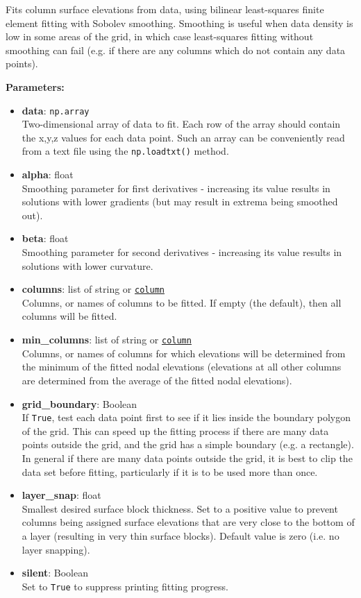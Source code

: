 Fits column surface elevations from data, using bilinear least-squares finite element fitting with Sobolev smoothing.  Smoothing is useful when data density is low in some areas of the grid, in which case least-squares fitting without smoothing can fail (e.g. if there are any columns which do not contain any data points).

\textbf{Parameters:}
\begin{itemize}
\item \textbf{data}: \texttt{np.array}\\
  Two-dimensional array of data to fit.  Each row of the array should contain the x,y,z values for each data point.  Such an array can be conveniently read from a text file using the \texttt{np.loadtxt()} method.
\item \textbf{alpha}: float\\
  Smoothing parameter for first derivatives - increasing its value results in solutions with lower gradients (but may result in extrema being smoothed out).
\item \textbf{beta}: float\\
  Smoothing parameter for second derivatives - increasing its value results in solutions with lower curvature.
\item \textbf{columns}: list of string or \hyperref[columnobjects]{\texttt{column}}\\
  Columns, or names of columns to be fitted.  If empty (the default), then all columns will be fitted.
\item \textbf{min\_columns}: list of string or \hyperref[columnobjects]{\texttt{column}}\\
  Columns, or names of columns for which elevations will be determined from the minimum of the fitted nodal elevations (elevations at all other columns are determined from the average of the fitted nodal elevations).
\item \textbf{grid\_boundary}: Boolean\\
  If \texttt{True}, test each data point first to see if it lies inside the boundary polygon of the grid.  This can speed up the fitting process if there are many data points outside the grid, and the grid has a simple boundary (e.g. a rectangle).  In general if there are many data points outside the grid, it is best to clip the data set before fitting, particularly if it is to be used more than once.
\item \textbf{layer\_snap}: float\\
  Smallest desired surface block thickness.  Set to a positive value to prevent columns being assigned surface elevations that are very close to the bottom of a layer (resulting in very thin surface blocks).  Default value is zero (i.e. no layer snapping).
\item \textbf{silent}: Boolean\\
  Set to \texttt{True} to suppress printing fitting progress.
\end{itemize}


